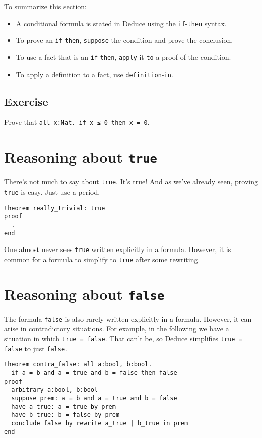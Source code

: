 \documentclass[12pt]{article}
\begin{document}
To summarize this section:
\begin{itemize}
\item A conditional formula is stated in Deduce using the
  \texttt{if}-\texttt{then} syntax.
\item To prove an \texttt{if}-\texttt{then}, \texttt{suppose} the
  condition and prove the conclusion.
\item To use a fact that is an \texttt{if}-\texttt{then},
  \texttt{apply} it \texttt{to} a proof of the condition.
\item To apply a definition to a fact, use
  \texttt{definition}-\texttt{in}.
\end{itemize}

\subsection*{Exercise}

Prove that \texttt{all x:Nat. if x ≤ 0 then x = 0}.

\pagebreak

\section{Reasoning about \texttt{true}}
\label{sec:true}

There's not much to say about \texttt{true}. It's true!  And as we've
already seen, proving \texttt{true} is easy. Just use a period.

\begin{verbatim}
theorem really_trivial: true
proof
  .
end
\end{verbatim}

\noindent One almost never sees \texttt{true} written explicitly in a
formula. However, it is common for a formula to simplify to
\texttt{true} after some rewriting.

\pagebreak

\section{Reasoning about \texttt{false}}
\label{sec:false}

The formula \texttt{false} is also rarely written explicitly in a
formula.  However, it can arise in contradictory situations. For
example, in the following we have a situation in which \texttt{true = false}.
That can't be, so Deduce simplifies \texttt{true = false}
to just \texttt{false}.

\begin{verbatim}
theorem contra_false: all a:bool, b:bool.
  if a = b and a = true and b = false then false
proof
  arbitrary a:bool, b:bool
  suppose prem: a = b and a = true and b = false
  have a_true: a = true by prem
  have b_true: b = false by prem
  conclude false by rewrite a_true | b_true in prem
end
\end{verbatim}
\end{document}
